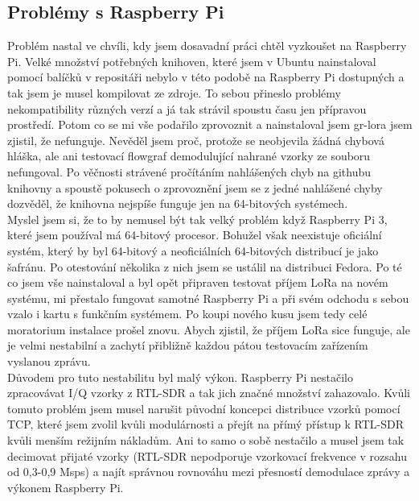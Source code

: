 \documentclass{ctuthesis}
\begin{document}
\subsection{Problémy s Raspberry Pi} \label{rpiproblems}
Problém nastal ve chvíli, kdy jsem dosavadní práci chtěl vyzkoušet na Raspberry Pi. Velké množství potřebných knihoven, které jsem v Ubuntu nainstaloval pomocí balíčků v repositáři nebylo v této podobě na Raspberry Pi dostupných a tak jsem je musel kompilovat ze zdroje. To sebou přineslo problémy nekompatibility různých verzí a já tak strávil spoustu času jen přípravou prostředí. Potom co se mi vše podařilo zprovoznit a nainstaloval jsem gr-lora jsem zjistil, že nefunguje. Nevěděl jsem proč, protože se neobjevila žádná chybová hláška, ale ani testovací flowgraf demodulující nahrané vzorky ze souboru nefungoval. Po věčnosti strávené pročítáním nahlášených chyb na githubu knihovny a spoustě pokusech o zprovoznění jsem se z jedné nahlášené chyby dozvěděl, že knihovna nejspíše funguje jen na 64-bitových systémech.\\
Myslel jsem si, že to by nemusel být tak velký problém když Raspberry Pi 3, které jsem používal má 64-bitový procesor. Bohužel však neexistuje oficiální systém, který by byl 64-bitový a neoficiálních 64-bitových distribucí je jako šafránu. Po otestování několika z nich jsem se ustálil na distribuci Fedora. Po té co jsem vše nainstaloval a byl opět připraven testovat příjem LoRa na novém systému, mi přestalo fungovat samotné Raspberry Pi a při svém odchodu s sebou vzalo i kartu s funkčním systémem. Po koupi nového kusu jsem tedy celé moratorium instalace prošel znovu. Abych zjistil, že příjem LoRa sice funguje, ale je velmi nestabilní a zachytí přibližně každou pátou testovacím zařízením vyslanou zprávu.\\
Důvodem pro tuto nestabilitu byl malý výkon. Raspberry Pi nestačilo zpracovávat I/Q vzorky z RTL-SDR a tak jich značné množství zahazovalo. Kvůli tomuto problém jsem musel narušit původní koncepci distribuce vzorků pomocí TCP, které jsem zvolil kvůli modulárnosti a přejít na přímý přístup k RTL-SDR kvůli menším režijním nákladům. Ani to samo o sobě nestačilo a musel jsem tak decimovat přijaté vzorky (RTL-SDR nepodporuje vzorkovací frekvence v rozsahu od 0,3-0,9 Msps) a najít správnou rovnováhu mezi přesností demodulace zprávy a výkonem Raspberry Pi.
\end{document}

